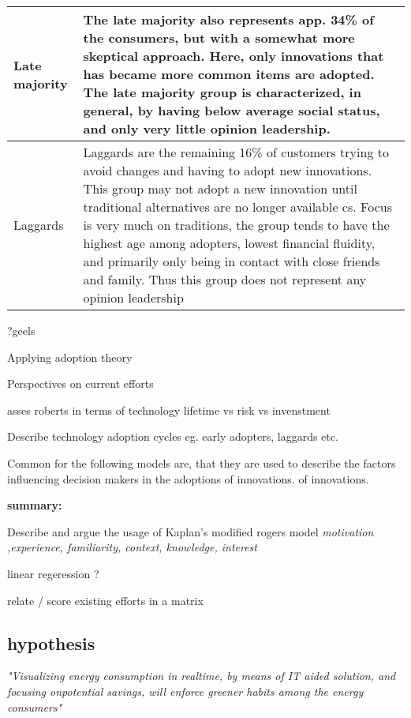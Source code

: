 \documentclass[conference]{IEEEtran}
\begin{document}
\begin{table}[ht]
\begin{tabular}{|p{2cm} |p{5.5cm}|}
Late majority & 
The late majority also represents app. 34\% of the consumers\cite{diffusion2}, but with a somewhat more skeptical approach. Here, only innovations that has became more common items are adopted. The late majority group is characterized, in general, by having below average social status, and only very little opinion leadership\cite{rogers_model}.\\
\hline

Laggards & 
Laggards are the remaining 16\% of customers trying to avoid changes and having to adopt new innovations. This group may not adopt a new innovation until traditional alternatives are no longer available  cs\cite{diffusion2}. Focus is very much on traditions, the group tends to have the highest age among adopters, lowest financial fluidity, and primarily only being in contact with close friends and family. Thus this group does not represent any opinion leadership\cite{rogers_model} \\ 
\hline

\end{tabular}

\label{table:nonlin} %

\end{table}



?geels 


Applying adoption theory

Perspectives on current efforts

asses roberts in terms of technology lifetime vs risk vs invenstment


Describe technology adoption cycles eg. early adopters, laggards etc.

Common for the following models are, that they are used to describe the factors influencing decision makers in the adoptions of innovations.
of innovations.



\textbf{summary:}

Describe and argue the usage of Kaplan's modified rogers model
\textit{motivation ,experience, familiarity, context, knowledge, interest}

linear regeression ?

relate / score existing efforts in a matrix

\subsection{hypothesis}
\textit{"Visualizing energy consumption in realtime, by means of IT aided solution, and focusing onpotential savings, will enforce greener habits among the energy consumers"}
\end{document}
